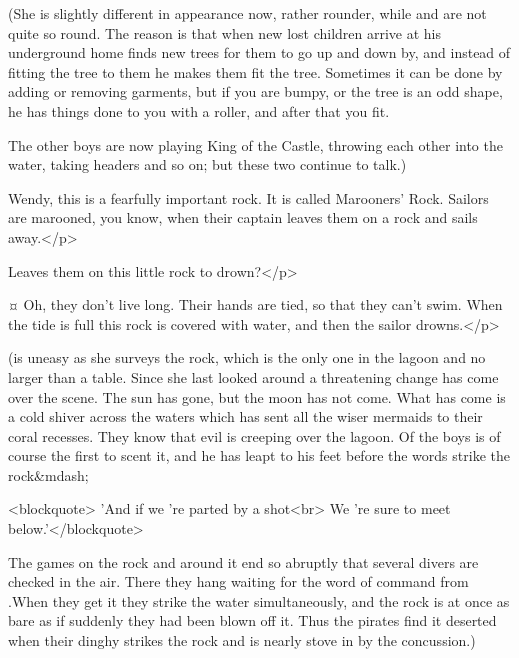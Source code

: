 \begin{stagedir}
(She is slightly different in appearance now, rather rounder, while \john and \michael are not quite so round.
The reason is that when new lost children arrive at his underground home
\peter finds new trees for them to go up and down by,
and instead of fitting the tree to them he makes them fit the tree.
Sometimes it can be done by adding or removing garments,
but if you are bumpy, or the tree is an odd shape, he has things done to you with a roller, and after that you fit.

The other boys are now playing King of the Castle, throwing each other into the water,
taking headers and so on; but these two continue to talk.)
\end{stagedir}

\peterspeaks
Wendy, this is a fearfully important rock.
It is called Marooners' Rock.
Sailors are marooned, you know, when their captain leaves them on a rock and sails away.</p>

\wendyspeaks
Leaves them on this little rock to drown?</p>

\peterspeaks {}¤
Oh, they don't live long.
Their hands are tied, so that they can't swim.
When the tide is full this rock is covered with water, and then the sailor drowns.</p>

\begin{stagedir}
(\wendy is uneasy as she surveys the rock, which is the only one in the lagoon and no larger than a table.
Since she last looked around a threatening change has come over the scene.
The sun has gone, but the moon has not come.
What has come is a cold shiver across the waters which has sent all the wiser mermaids to their coral recesses.
They know that evil is creeping over the lagoon.
Of the boys \peter is of course the first to scent it, and he has leapt to his feet before the words strike the rock&mdash;
\end{stagedir}

<blockquote> 'And if we 're parted by a shot<br> We 're sure to meet below.'</blockquote>

\begin{stagedir}
The games on the rock and around it end so abruptly that several divers are checked in the air.
There they hang waiting for the word of command from \peter.When they get it they strike the water simultaneously, and the rock is at once as bare as if suddenly they had been blown off it.
Thus the pirates find it deserted when their dinghy strikes the rock and is nearly stove in by the concussion.)
\end{stagedir}

